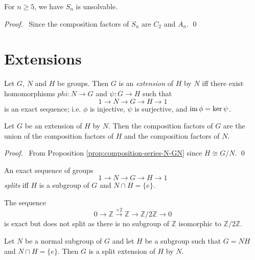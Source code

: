 \begin{cor}
For $n \geq 5$, we have $S_n$ is unsolvable.
\end{cor}

\begin{proof}
\pf\ Since the composition factors of $S_n$ are $C_2$ and $A_n$. \qed
\end{proof}

\chapter{Extensions}

\begin{df}[Extension]
Let $G$, $N$ and $H$ be groups. Then $G$ is an \emph{extension} of $H$ by $N$ iff there exist homomorphisms $phi : N \rightarrow G$ and $\psi : G \rightarrow H$ such that
\[ 1 \rightarrow N \rightarrow G \rightarrow H \rightarrow 1 \]
is an exact sequence; i.e. $\phi$ is injective, $\psi$ is surjective, and $\operatorname{im} \phi = \ker \psi$.
\end{df}

\begin{prop}
Let $G$ be an extension of $H$ by $N$. Then the composition factors of $G$ are the union of the composition factors of $H$ and the composition factors of $N$.
\end{prop}

\begin{proof}
\pf\ From Proposition \ref{prop:composition-series-N-GN} since $H \cong G / N$. \qed
\end{proof}

\begin{df}
An exact sequence of groups
\[ 1 \rightarrow N \rightarrow G \rightarrow H \rightarrow 1 \]
\emph{splits} iff $H$ is a subgroup of $G$ and $N \cap H = \{e\}$.
\end{df}

\begin{ex}
The sequence
\[ 0 \rightarrow \mathbb{Z} \stackrel{\times 2}{\rightarrow} \mathbb{Z} \rightarrow \mathbb{Z} / 2 \mathbb{Z} \rightarrow 0 \]
is exact but does not split as there is no subgroup of $\mathbb{Z}$ isomorphic to $\mathbb{Z} / 2 \mathbb{Z}$.
\end{ex}

\begin{prop}
Let $N$ be a normal subgroup of $G$ and let $H$ be a subgroup such that $G = NH$ and $N \cap H = \{e\}$. Then $G$ is a split extension of $H$ by $N$.
\end{prop}

